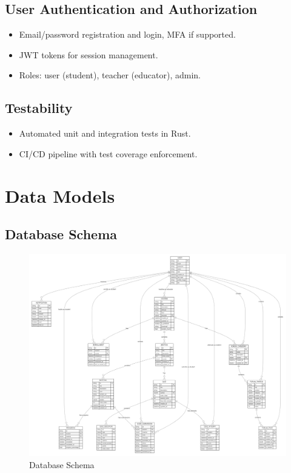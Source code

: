 \documentclass[a4paper, 11pt]{scrreprt}
\begin{document}
\section{User Authentication and Authorization}
\begin{itemize}
    \item Email/password registration and login, MFA if supported.
    \item JWT tokens for session management.
    \item Roles: user (student), teacher (educator), admin.
\end{itemize}

\section{Testability}
\begin{itemize}
    \item Automated unit and integration tests in Rust.
    \item CI/CD pipeline with test coverage enforcement.
\end{itemize}

\chapter{Data Models}

\section{Database Schema}
\begin{figure}[!ht]
    \centering
    \includegraphics[width=\textwidth]{database_schema.png}
    \caption{Database Schema}
\end{figure}
\end{document}
